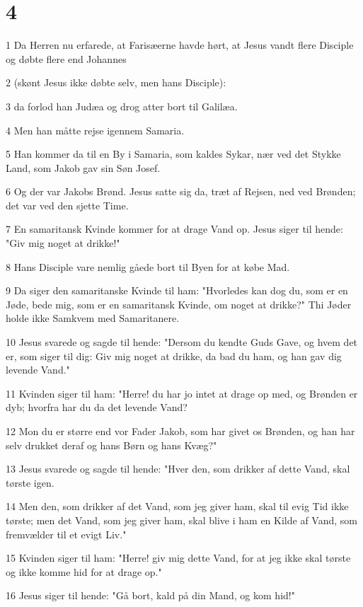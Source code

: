 \chapter{4}

\par 1 Da Herren nu erfarede, at Farisæerne havde hørt, at Jesus vandt flere Disciple og døbte flere end Johannes
\par 2 (skønt Jesus ikke døbte selv, men hans Disciple):
\par 3 da forlod han Judæa og drog atter bort til Galilæa.
\par 4 Men han måtte rejse igennem Samaria.
\par 5 Han kommer da til en By i Samaria, som kaldes Sykar, nær ved det Stykke Land, som Jakob gav sin Søn Josef.
\par 6 Og der var Jakobs Brønd. Jesus satte sig da, træt af Rejsen, ned ved Brønden; det var ved den sjette Time.
\par 7 En samaritansk Kvinde kommer for at drage Vand op. Jesus siger til hende: "Giv mig noget at drikke!"
\par 8 Hans Disciple vare nemlig gåede bort til Byen for at købe Mad.
\par 9 Da siger den samaritanske Kvinde til ham: "Hvorledes kan dog du, som er en Jøde, bede mig, som er en samaritansk Kvinde, om noget at drikke?" Thi Jøder holde ikke Samkvem med Samaritanere.
\par 10 Jesus svarede og sagde til hende: "Dersom du kendte Guds Gave, og hvem det er, som siger til dig: Giv mig noget at drikke, da bad du ham, og han gav dig levende Vand."
\par 11 Kvinden siger til ham: "Herre! du har jo intet at drage op med, og Brønden er dyb; hvorfra har du da det levende Vand?
\par 12 Mon du er større end vor Fader Jakob, som har givet os Brønden, og han har selv drukket deraf og hans Børn og hans Kvæg?"
\par 13 Jesus svarede og sagde til hende: "Hver den, som drikker af dette Vand, skal tørste igen.
\par 14 Men den, som drikker af det Vand, som jeg giver ham, skal til evig Tid ikke tørste; men det Vand, som jeg giver ham, skal blive i ham en Kilde af Vand, som fremvælder til et evigt Liv."
\par 15 Kvinden siger til ham: "Herre! giv mig dette Vand, for at jeg ikke skal tørste og ikke komme hid for at drage op."
\par 16 Jesus siger til hende: "Gå bort, kald på din Mand, og kom hid!"
